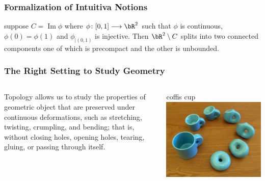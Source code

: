 \documentclass{beamer}
\begin{document}
\begin{frame}
    \frametitle{Formalization of Intuitiva Notions}

    \begin{theorem}
        suppose $C=\operatorname{Im} \phi$ where $\phi\colon [0, 1]\longrightarrow \bR^2$ such that $\phi$ is \alert{continuous}, 
        $\phi(0) = \phi(1)$ and $\phi_{|(0, 1)}$ is injective. Then $\bR^2\setminus C$ splits into two \alert{connected components}
        one of which is \alert{precompact} and the other is unbounded.
    \end{theorem}

\end{frame}


\begin{frame}
    \frametitle{The Right Setting to Study Geometry}

    \begin{columns}
        \begin{column}{0.5\textwidth}
            Topology allows us to study the properties of geometric object that are preserved under continuous deformations, such as stretching, 
            twisting, crumpling, and bending; that is, without closing holes, opening holes, tearing, gluing, or passing through itself. 
        \end{column}
        \begin{column}{0.5\textwidth}
            \begin{block}{coffis cup}
                \href{https://upload.wikimedia.org/wikipedia/commons/2/26/Mug_and_Torus_morph.gif}{\includegraphics[width=\textwidth]{assets/mug_torus.jpg}}
            \end{block}
        \end{column}
    \end{columns}

\end{frame}
\end{document}
